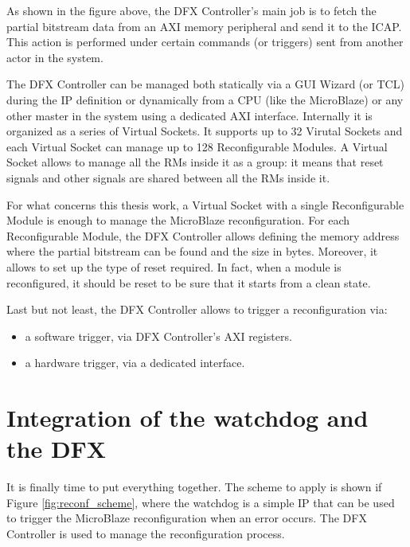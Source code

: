 As shown in the figure above, the DFX Controller's main job is to fetch the partial bitstream data from an AXI memory peripheral and send it to the ICAP. This action is performed under certain commands (or triggers) sent from another actor in the system.\bigskip

The DFX Controller can be managed both statically via a GUI Wizard (or TCL) during the IP definition or dynamically from a CPU (like the MicroBlaze) or any other master in the system using a dedicated AXI interface. Internally it is organized as a series of Virtual Sockets. It supports up to 32 Virutal Sockets and each Virtual Socket can manage up to 128 Reconfigurable Modules. A Virtual Socket allows to manage all the RMs inside it as a group: it means that reset signals and other signals are shared between all the RMs inside it. \bigskip

For what concerns this thesis work, a Virtual Socket with a single Reconfigurable Module is enough to manage the MicroBlaze reconfiguration. For each Reconfigurable Module, the DFX Controller allows defining the memory address where the partial bitstream can be found and the size in bytes. Moreover, it allows to set up the type of reset required. In fact, when a module is reconfigured, it should be reset to be sure that it starts from a clean state. \bigskip

Last but not least, the DFX Controller allows to trigger a reconfiguration via:
\begin{itemize}
    \item a software trigger, via DFX Controller's AXI registers.
    \item a hardware trigger, via a dedicated interface.
\end{itemize}

\section{Integration of the watchdog and the DFX}
It is finally time to put everything together. The scheme to apply is shown if Figure \ref{fig:reconf_scheme}, where the watchdog is a simple IP that can be used to trigger the MicroBlaze reconfiguration when an error occurs. The DFX Controller is used to manage the reconfiguration process. 

